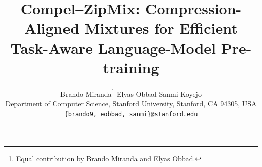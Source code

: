 \documentclass[twoside,11pt]{article}
\begin{document}
\title{Compel--ZipMix: Compression-Aligned Mixtures for Efficient Task-Aware Language-Model Pre-training}

\author{%
  \name Brando Miranda\thanks{Equal contribution by Brando Miranda and Elyas Obbad.} \AND \name Elyas Obbad \AND
  \name Sanmi Koyejo \\
  \addr Department of Computer Science, Stanford University, Stanford, CA 94305, USA \\
  \texttt{\{brando9, eobbad, sanmi\}@stanford.edu} }


\maketitle








\appendix

\end{document}
